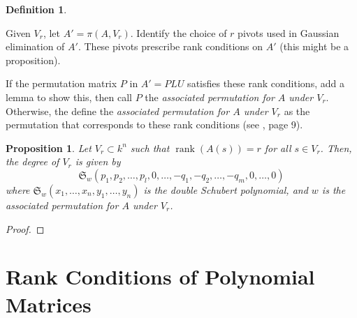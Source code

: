 \documentclass{amsart}
\newtheorem{proposition}[theorem]{Proposition}
\theoremstyle{definition}
\newtheorem{definition}[theorem]{Definition}
\theoremstyle{remark}
\DeclareMathOperator{\rank}{rank}
\numberwithin{equation}{section}
\begin{document}
\begin{definition}
  \begin{aroundtodo}
    Given $V_r$, let $A' = \pi(A, V_r)$. Identify the choice of $r$ pivots used in Gaussian elimination of $A'$. These pivots prescribe rank conditions on $A'$ (this might be a proposition).

    If the permutation matrix $P$ in $A' = PLU$ satisfies these rank conditions, add a lemma to show this, then call $P$ the \emph{associated permutation for $A$ under $V_r$}. Otherwise, the define the \emph{associated permutation for $A$ under $V_r$} as the permutation that corresponds to these rank conditions (see \cite{fulton1998schubert}, page 9).
  \end{aroundtodo}
\end{definition}

\begin{proposition}
  Let $V_r \subset k^n$ such that $\rank(A(s)) = r$ for all $s \in V_r$. Then, the degree of $V_r$ is given by
  \begin{equation*}
    \mathfrak{S}_w(p_1, p_2, \ldots, p_l, 0, \ldots, -q_1, -q_2, \ldots, -q_m, 0, \ldots, 0)
  \end{equation*}
  where $\mathfrak{S}_w(x_1, \ldots, x_n, y_1, \ldots, y_n)$ is the double Schubert polynomial, and $w$ is the associated permutation for $A$ under $V_r$.
\end{proposition}

\begin{proof}
\end{proof}

\section{Rank Conditions of Polynomial Matrices}
\end{document}
